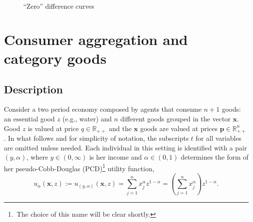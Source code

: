 \documentclass[english, a4paper, 12pt]{article}
\begin{document}
	\begin{figure}[H]
		\caption{``Zero'' difference curves}
		\label{fig:ZeroCurve}
		
		\hspace{0.045\textwidth}
		 \vspace{-2ex}

	\end{figure}
\section{Consumer aggregation and category goods} \label{sec:MixedAgg}

\subsection{Description}
Consider a two period economy composed by agents that consume $n+1$ goods: an essential good $z$ (e.g., water) and $n$ different goods grouped in the vector $\mathbf{x}$. Good $z$ is valued at price $q \in \mathbb{R}_{++}$ and the $\mathbf{x}$ goods are valued at prices $\mathbf{p} \in \mathbb{R}^{n}_{++}$.  In what follows and for simplicity of notation, the subscripts $t$ for all variables are omitted unless needed. Each individual in this setting is identified with a pair $(y,\alpha)$, where $y \in (0,\infty)$ is her income and $\alpha \in (0,1)$ determines the form of her pseudo-Cobb-Douglas (PCD)\footnote{\,The choice of this name will be clear shortly.} utility function,
	$$u_{\alpha}(\mathbf{x},z) := u_{(y,\alpha)}(\mathbf{x},z) = \sum_{j=1}^{n} x_{j}^{\alpha}z^{1-\alpha} = \left(\sum_{j=1}^{n} x_{j}^{\alpha}\right)z^{1-\alpha}.$$
\end{document}
